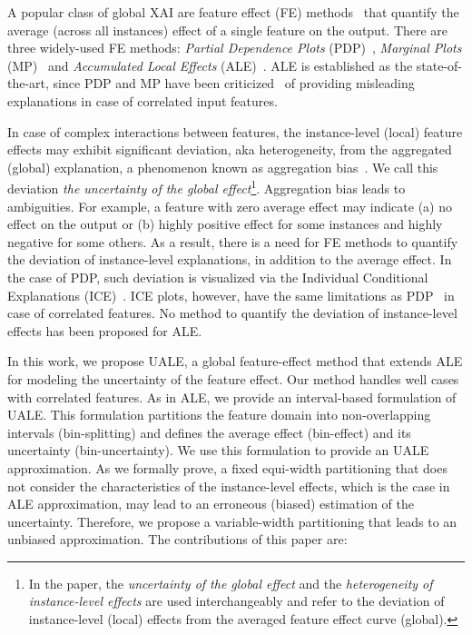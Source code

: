 \documentclass[twoside]{article}
\begin{document}
A popular class of global XAI are feature effect (FE) methods~\citep{Gromping2020MAEP} that quantify the average (across all instances) effect of a single feature on the output. There are three widely-used FE methods: \emph{Partial Dependence Plots} (PDP)~\citep{friedman2001greedy}, \emph{Marginal Plots} (MP)~\citep{apley2020visualizing} and \emph{Accumulated Local Effects} (ALE)~\citep{apley2020visualizing}. ALE is established as the state-of-the-art, since PDP and MP have been criticized~\citep{baniecki2021fooling, Gromping2020MAEP} of providing misleading explanations in case of correlated input features.

In case of complex interactions between features, the instance-level (local) feature effects may exhibit significant deviation, aka heterogeneity, from the aggregated (global) explanation, a phenomenon known as aggregation bias~\citep{mehrabi2021survey}. We call this deviation \emph{the uncertainty of the global effect}\footnote{In the paper, the \emph{uncertainty of the global effect} and the \emph{heterogeneity of instance-level effects} are used interchangeably and refer to the deviation of instance-level (local) effects from the averaged feature effect curve (global).}. Aggregation bias leads to ambiguities. For example, a feature with zero average effect may indicate (a) no effect on the output or (b) highly positive effect for some instances and highly negative for some others. As a result, there is a need for FE methods to quantify the deviation of instance-level explanations, in addition to the average effect. In the case of PDP, such deviation is visualized via the Individual Conditional Explanations (ICE)~\citep{goldstein2015peeking}. ICE plots, however, have the same limitations as PDP~\citep{baniecki2021fooling} in case of correlated features. No method to quantify the deviation of instance-level effects has been proposed for ALE.

In this work, we propose UALE, a global feature-effect method that extends ALE for modeling the uncertainty of the feature effect. Our method handles well cases with correlated features.  As in ALE, we provide an interval-based formulation of UALE. This formulation partitions the feature domain into non-overlapping intervals (bin-splitting) and defines the average effect (bin-effect) and its uncertainty (bin-uncertainty). We use this formulation to provide an UALE approximation. As we formally prove, a fixed equi-width partitioning that does not consider the characteristics of the instance-level effects, which is the case in ALE approximation, may lead to an erroneous (biased) estimation of the uncertainty.  Therefore, we propose a variable-width partitioning that leads to an unbiased approximation. The contributions of this paper are:
\end{document}

